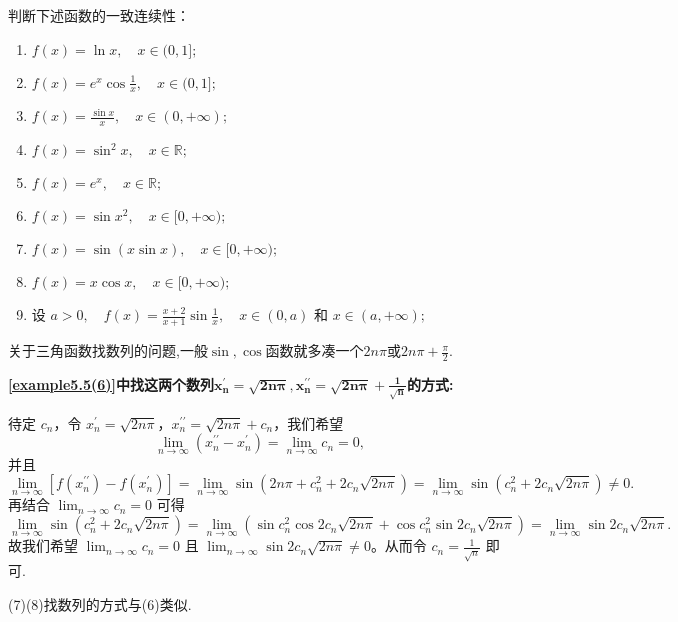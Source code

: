 \documentclass[../../main.tex]{subfiles}
\begin{document}
\begin{example}
判断下述函数的一致连续性：
\begin{enumerate}[(1)]
\item \( f(x) = \ln x, \quad x \in (0, 1]; \)

\item \( f(x) = e^x \cos \frac{1}{x}, \quad x \in (0, 1]; \)

\item \( f(x) = \frac{\sin x}{x}, \quad x \in (0, +\infty); \)

\item \( f(x) = \sin^2 x, \quad x \in \mathbb{R}; \)

\item \( f(x) = e^x, \quad x \in \mathbb{R}; \)

\item \( f(x) = \sin x^2, \quad x \in [0, +\infty); \)

\item \( f(x) = \sin (x \sin x), \quad x \in [0, +\infty); \)

\item \( f(x) = x \cos x, \quad x \in [0, +\infty); \)

\item 设 \( a > 0, \quad f(x) = \frac{x+2}{x+1} \sin \frac{1}{x}, \quad x \in (0, a) \) 和 \( x \in (a, +\infty); \)
\end{enumerate}
\end{example}
\begin{note}
关于三角函数找数列的问题,一般$\sin,\cos$函数就多凑一个$2n\pi$或$2n\pi+\frac{\pi}{2}$.
\end{note}
\begin{remark}
\hypertarget{找这两个数列的方法}{\textbf{\ref{example5.5(6)}中找这两个数列$\boldsymbol{x}_{\boldsymbol{n}}^{\prime}=\sqrt{\mathbf{2}\boldsymbol{n\pi }},\boldsymbol{x}_{\boldsymbol{n}}^{\prime\prime}=\sqrt{\mathbf{2}\boldsymbol{n\pi }}+\frac{\mathbf{1}}{\sqrt{\boldsymbol{n}}}$的方式:}}待定 $c_n$，令 $x_{n}^{\prime} = \sqrt{2n\pi}$，$x_{n}^{\prime\prime} = \sqrt{2n\pi} + c_n$，我们希望
\[
\lim_{n \rightarrow \infty} \left( x_{n}^{\prime\prime} - x_{n}^{\prime} \right) = \lim_{n \rightarrow \infty} c_n = 0,
\]
并且
\[
\lim_{n \rightarrow \infty} \left[ f\left( x_{n}^{\prime\prime} \right) - f\left( x_{n}^{\prime} \right) \right] = \lim_{n \rightarrow \infty} \sin \left( 2n\pi + c_{n}^{2} + 2c_n \sqrt{2n\pi} \right) = \lim_{n \rightarrow \infty} \sin \left( c_{n}^{2} + 2c_n \sqrt{2n\pi} \right) \ne 0.
\]
再结合 $\lim_{n \rightarrow \infty} c_n = 0$ 可得
\[
\lim_{n \rightarrow \infty} \sin \left( c_{n}^{2} + 2c_n \sqrt{2n\pi} \right) = \lim_{n \rightarrow \infty} \left( \sin c_{n}^{2} \cos 2c_n \sqrt{2n\pi} + \cos c_{n}^{2} \sin 2c_n \sqrt{2n\pi} \right) = \lim_{n \rightarrow \infty} \sin 2c_n \sqrt{2n\pi}.
\]
故我们希望 $\lim_{n \rightarrow \infty} c_n = 0$ 且 $\lim_{n \rightarrow \infty} \sin 2c_n \sqrt{2n\pi} \ne 0$。从而令 $c_n = \frac{1}{\sqrt{n}}$ 即可.

(7)(8)找数列的方式与(6)类似.
\end{remark}
\end{document}
